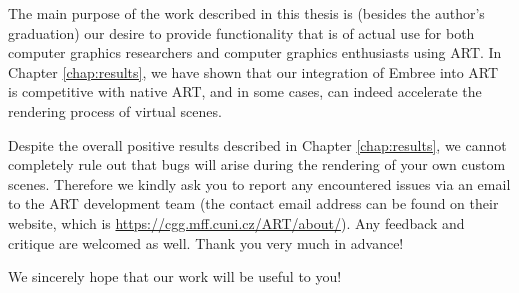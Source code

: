 The main purpose of the work described in this thesis is (besides the author's graduation) our desire to provide functionality that is of actual use for both computer graphics researchers and computer graphics enthusiasts using ART. In Chapter \ref{chap:results}, we have shown that our integration of Embree into ART is competitive with native ART, and in some cases, can indeed accelerate the rendering process of virtual scenes.

Despite the overall positive results described in Chapter \ref{chap:results}, we cannot completely rule out that bugs will arise during the rendering of your own custom scenes. Therefore we kindly ask you to report any encountered issues via an email to the ART development team (the contact email address can be found on their website, which is \href{https://cgg.mff.cuni.cz/ART/about/}{https://cgg.mff.cuni.cz/ART/about/}). Any feedback and critique are welcomed as well. Thank you very much in advance!

We sincerely hope that our work will be useful to you!